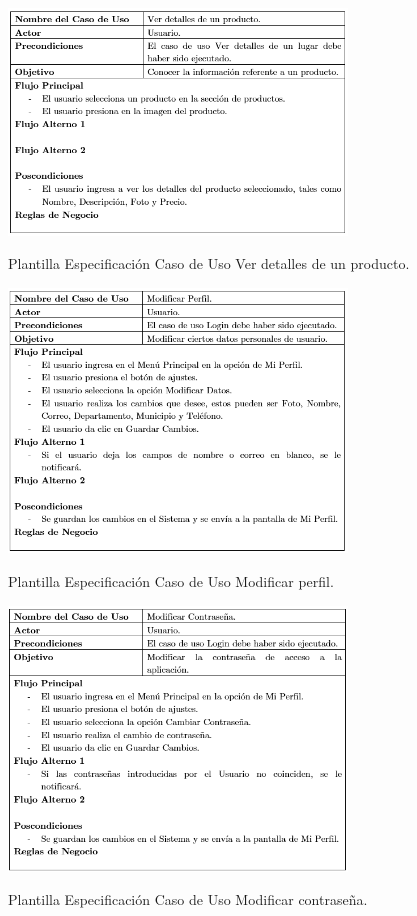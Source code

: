 \documentclass[12pt,letterpaper,openany]{book}
\begin{document}
\begin{table}[H]
\centering
\includegraphics[width=9cm]{./imagenes/PCU/ver_detalles_producto}
\caption{Plantilla Especificación Caso de Uso Ver detalles de un producto.}
\end{table}

\begin{table}[H]
\centering
\includegraphics[width=9cm]{./imagenes/PCU/modificar_perfil}
\caption{Plantilla Especificación Caso de Uso Modificar perfil.}
\end{table}

\begin{table}[H]
\centering
\includegraphics[width=9cm]{./imagenes/PCU/modificar_contrasena}
\caption{Plantilla Especificación Caso de Uso Modificar contraseña.}
\end{table}
\end{document}
